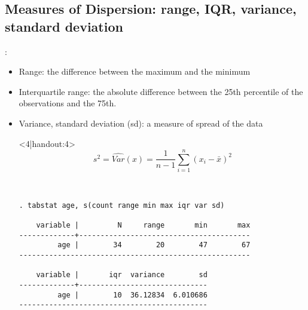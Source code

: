 \subsection{Measures of Dispersion: range, IQR, variance, standard deviation}
\begin{frame}[fragile]{{\secname: \subsecname}}	
\begin{itemize}
	\item<1|handout:1-> Range: the difference between the maximum and the minimum 
	\item<2|handout:2-> Interquartile range: the absolute difference between the 25th percentile of the observations and the 75th.
	\item<3|handout:3-> Variance, standard deviation (sd): a measure of spread of the data
	\item[]<4|handout:4>
\footnotesize
	\begin{displaymath}
s^{2} = \widehat{Var}(x)=\frac{1}{n-1} \sum_{i=1}^{n}\left(x_{i}-\bar{x}\right)^{2}
\end{displaymath}

\scriptsize
\begin{verbatim}


. tabstat age, s(count range min max iqr var sd)

    variable |         N     range       min       max
-------------+----------------------------------------
         age |        34        20        47        67
------------------------------------------------------

    variable |       iqr  variance        sd
-------------+------------------------------
         age |        10  36.12834  6.010686
--------------------------------------------
\end{verbatim}

\end{itemize}
\end{frame}





